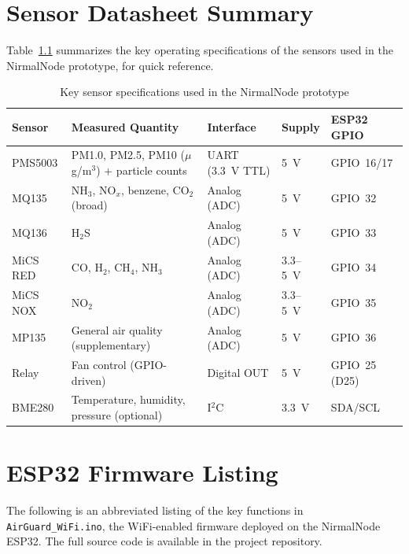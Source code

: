 \appendix

\chapter{Sensor Datasheet Summary}
\label{app:datasheets}

Table~\ref{tab:app-datasheets} summarizes the key operating specifications of the sensors used in the NirmalNode prototype, for quick reference.

\begin{table}[htbp]
\centering
\caption{Key sensor specifications used in the NirmalNode prototype}
\label{tab:app-datasheets}
\small
\begin{tabular}{@{}p{2.4cm}p{4.8cm}p{2cm}p{2.5cm}p{1.8cm}@{}}
\toprule
\textbf{Sensor} & \textbf{Measured Quantity} & \textbf{Interface} & \textbf{Supply} & \textbf{ESP32 GPIO} \\
\midrule
PMS5003  & PM1.0, PM2.5, PM10 ($\mu$g/m$^3$) + particle counts & UART (3.3~V TTL) & 5~V & GPIO~16/17 \\
MQ135    & NH$_3$, NO$_x$, benzene, CO$_2$ (broad) & Analog (ADC) & 5~V & GPIO~32 \\
MQ136    & H$_2$S                                  & Analog (ADC) & 5~V & GPIO~33 \\
MiCS RED & CO, H$_2$, CH$_4$, NH$_3$              & Analog (ADC) & 3.3--5~V & GPIO~34 \\
MiCS NOX & NO$_2$                                  & Analog (ADC) & 3.3--5~V & GPIO~35 \\
MP135    & General air quality (supplementary)     & Analog (ADC) & 5~V & GPIO~36 \\
Relay    & Fan control (GPIO-driven)               & Digital OUT  & 5~V & GPIO~25 (D25) \\
BME280   & Temperature, humidity, pressure (optional) & I$^2$C    & 3.3~V & SDA/SCL \\
\bottomrule
\end{tabular}
\end{table}

\chapter{ESP32 Firmware Listing}
\label{app:firmware}

The following is an abbreviated listing of the key functions in \texttt{AirGuard\_WiFi.ino}, the WiFi-enabled firmware deployed on the NirmalNode ESP32. The full source code is available in the project repository.

